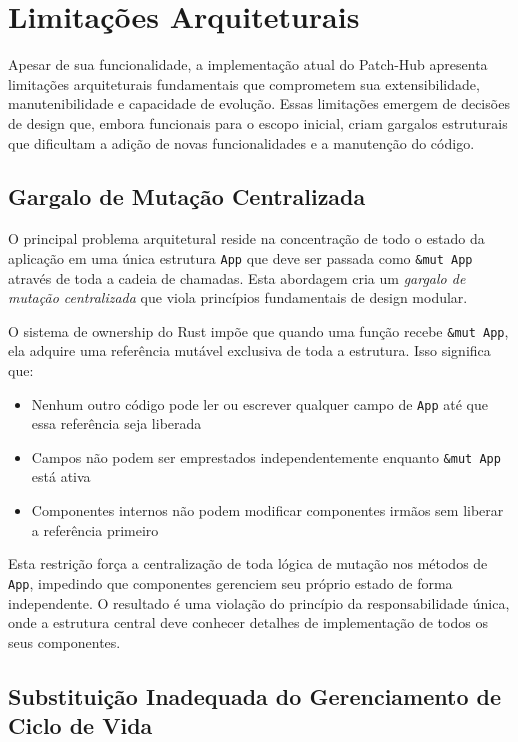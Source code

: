 \section{Limitações Arquiteturais}

Apesar de sua funcionalidade, a implementação atual do Patch-Hub apresenta limitações arquiteturais fundamentais que comprometem sua extensibilidade, manutenibilidade e capacidade de evolução. Essas limitações emergem de decisões de design que, embora funcionais para o escopo inicial, criam gargalos estruturais que dificultam a adição de novas funcionalidades e a manutenção do código.

\subsection{Gargalo de Mutação Centralizada}

O principal problema arquitetural reside na concentração de todo o estado da aplicação em uma única estrutura \texttt{App} que deve ser passada como \texttt{\&mut App} através de toda a cadeia de chamadas. Esta abordagem cria um \textit{gargalo de mutação centralizada} que viola princípios fundamentais de design modular.

O sistema de ownership do Rust impõe que quando uma função recebe \texttt{\&mut App}, ela adquire uma referência mutável exclusiva de toda a estrutura. Isso significa que:

\begin{itemize}
    \item Nenhum outro código pode ler ou escrever qualquer campo de \texttt{App} até que essa referência seja liberada
    \item Campos não podem ser emprestados independentemente enquanto \texttt{\&mut App} está ativa
    \item Componentes internos não podem modificar componentes irmãos sem liberar a referência primeiro
\end{itemize}

Esta restrição força a centralização de toda lógica de mutação nos métodos de \texttt{App}, impedindo que componentes gerenciem seu próprio estado de forma independente. O resultado é uma violação do princípio da responsabilidade única, onde a estrutura central deve conhecer detalhes de implementação de todos os seus componentes.

\subsection{Substituição Inadequada do Gerenciamento de Ciclo de Vida}

